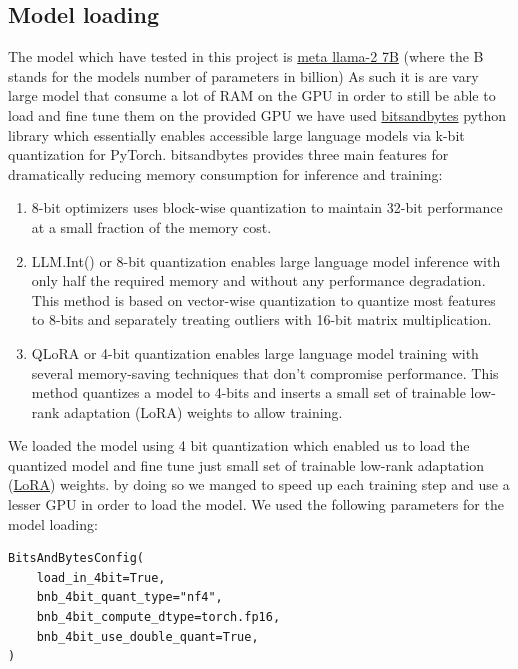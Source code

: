 \documentclass[11pt]{article}
\begin{document}
\subsection{Model loading}
The model which have tested in this project is  \href{https://huggingface.co/NousResearch/Llama-2-7b-chat-hf }{meta llama-2 7B} (where the B stands for the models number of parameters in billion) As such it is are vary large model that consume a lot of RAM on the GPU in order to still be able to load and fine tune them on the provided GPU we have used \href{https://pypi.org/project/bitsandbytes/}{bitsandbytes} python library which essentially enables accessible large language models via k-bit quantization for PyTorch. bitsandbytes provides three main features for dramatically reducing memory consumption for inference and training:
\begin{enumerate}
    \item 8-bit optimizers uses block-wise quantization to maintain 32-bit performance at a small fraction of the memory cost.
    \item LLM.Int() or 8-bit quantization enables large language model inference with only half the required memory and without any performance degradation. This method is based on vector-wise quantization to quantize most features to 8-bits and separately treating outliers with 16-bit matrix multiplication.
    \item QLoRA or 4-bit quantization enables large language model training with several memory-saving techniques that don’t compromise performance. This method quantizes a model to 4-bits and inserts a small set of trainable low-rank adaptation (LoRA) weights to allow training.
\end{enumerate}



We loaded the model using 4 bit quantization which enabled us to load the quantized model and fine tune just small set of trainable low-rank adaptation (\href{https://huggingface.co/papers/2106.09685}{LoRA}) weights. by doing so we manged to speed up each training step and use a lesser GPU in order to load the model.
We used the following parameters for the model loading:
\begin{verbatim}
BitsAndBytesConfig(
    load_in_4bit=True,
    bnb_4bit_quant_type="nf4",
    bnb_4bit_compute_dtype=torch.fp16,
    bnb_4bit_use_double_quant=True,
)
\end{verbatim}
\end{document}
